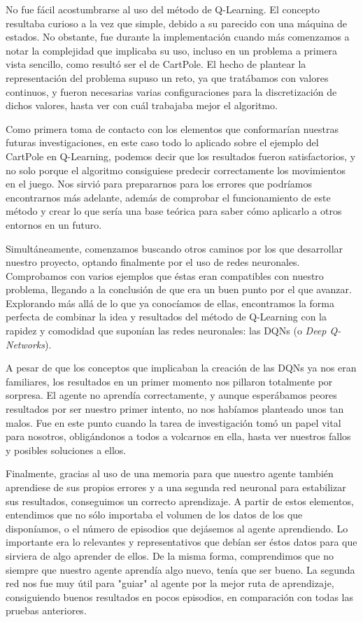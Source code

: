 No fue fácil acostumbrarse al uso del método de Q-Learning. El concepto resultaba curioso a la vez que simple, debido a su parecido con una máquina de estados. No obstante, fue durante la implementación cuando más comenzamos a notar la complejidad que implicaba su uso, incluso en un problema a primera vista sencillo, como resultó ser el de CartPole. El hecho de plantear la representación del problema supuso un reto, ya que tratábamos con valores continuos, y fueron necesarias varias configuraciones para la discretización de dichos valores, hasta ver con cuál trabajaba mejor el algoritmo.

Como primera toma de contacto con los elementos que conformarían nuestras futuras investigaciones, en este caso todo lo aplicado sobre el ejemplo del CartPole en Q-Learning, podemos decir que los resultados fueron satisfactorios, y no solo porque el algoritmo consiguiese predecir correctamente los movimientos en el juego. Nos sirvió para prepararnos para los errores que podríamos encontrarnos más adelante, además de comprobar el funcionamiento de este método y crear lo que sería una base teórica para saber cómo aplicarlo a otros entornos en un futuro.

Simultáneamente, comenzamos buscando otros caminos por los que desarrollar nuestro proyecto, optando finalmente por el uso de redes neuronales. Comprobamos con varios ejemplos que éstas eran compatibles con nuestro problema, llegando a la conclusión de que era un buen punto por el que avanzar. Explorando más allá de lo que ya conocíamos de ellas, encontramos la forma perfecta de combinar la idea y resultados del método de Q-Learning con la rapidez y comodidad que suponían las redes neuronales: las DQNs (o \textit{Deep Q-Networks}). 

A pesar de que los conceptos que implicaban la creación de las DQNs ya nos eran familiares, los resultados en un primer momento nos pillaron totalmente por sorpresa. El agente no aprendía correctamente, y aunque esperábamos peores resultados por ser nuestro primer intento, no nos habíamos planteado unos tan malos. Fue en este punto cuando la tarea de investigación tomó un papel vital para nosotros, obligándonos a todos a volcarnos en ella, hasta ver nuestros fallos y posibles soluciones a ellos. 

Finalmente, gracias al uso de una memoria para que nuestro agente también aprendiese de sus propios errores y a una segunda red neuronal para estabilizar sus resultados, conseguimos un correcto aprendizaje. A partir de estos elementos, entendimos que no sólo importaba el volumen de los datos de los que disponíamos, o el número de episodios que dejásemos al agente aprendiendo. Lo importante era lo relevantes y representativos que debían ser éstos datos para que sirviera de algo aprender de ellos. De la misma forma, comprendimos que no siempre que nuestro agente aprendía algo nuevo, tenía que ser bueno. La segunda red nos fue muy útil para "guiar" al agente por la mejor ruta de aprendizaje, consiguiendo buenos resultados en pocos episodios, en comparación con todas las pruebas anteriores.  

